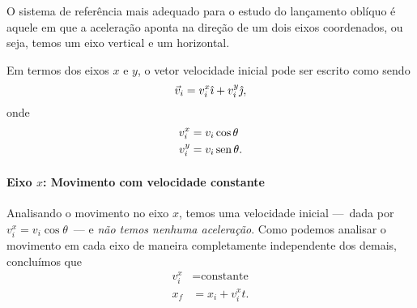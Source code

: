 \begin{marginfigure}
\centering
{}
\caption{O sistema de referência mais adequado para o estudo do lançamento oblíquo é aquele em que a aceleração aponta na direção de um dois eixos coordenados, ou seja, temos um eixo vertical e um horizontal.}
\end{marginfigure}

Em termos dos eixos $x$ e $y$, o vetor velocidade inicial pode ser escrito como
sendo
\begin{equation}
  \vec{v}_i = v_{i}^{x} \hat{\imath} + v_{i}^{y} \hat{\jmath},
\end{equation}
%
onde
\begin{align}
  v_{i}^{x} &= v_i\cos\theta \\
  v_{i}^{y} &= v_i\operatorname{sen}\theta.
\end{align}

\paragraph{Eixo $x$: Movimento com velocidade constante}

Analisando o movimento no eixo $x$, temos uma velocidade inicial ---~dada por $v_{i}^{x} = v_i\cos\theta$~--- e \emph{não temos nenhuma aceleração}. Como podemos analisar o movimento em cada eixo de maneira completamente independente dos demais, concluímos que
\begin{align}
  v_{i}^x &= \text{constante} \\
  x_{f} &= x_{i} + v_{i}^x t.\label{Eq:PosXProj}
\end{align}


